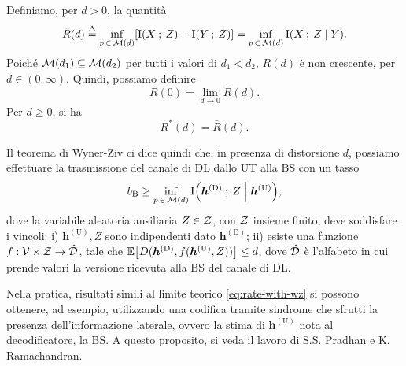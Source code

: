 \begin{thm}
    \label{thm:wz}

    Definiamo, per \(d > 0\), la quantità
    \begin{equation}
        \bar{R}(d) \define \inf_{p\,\in\,\set{M}(d)} \mleft[
            \mutual{X}{Z} - \mutual{Y}{Z}
            \mright]
        = \inf_{p\,\in\,\set{M}(d)} \mutual{X}{Z \given Y} .
    \end{equation}
    Poiché \(\mathcal{M}(d_1) \subseteq \mathcal{M}(d_2)\) per tutti i valori di \(d_1
    < d_2\), \(\bar{R}(d)\) è non crescente, per \(d \in (0,\infty)\). Quindi,
    possiamo definire
    \begin{equation}
        \bar{R}(0) = \lim_{d\to0} \bar{R}(d) .
    \end{equation}
    Per \(d \ge 0\), si ha
    \begin{equation}
        R^{*}(d) = \bar{R}(d) .
    \end{equation}
\end{thm}

Il teorema di Wyner-Ziv ci dice quindi che, in presenza di distorsione \(d\),
possiamo effettuare la trasmissione del canale di DL dallo UT alla BS con un
tasso
\begin{equation}
    b_\mathrm{B} \ge \inf_{p\,\in\,\set{M}(d)}
    \mutual{\bm{h}^\mathrm{(D)}}{Z \given \bm{h}^\mathrm{(U)}} ,
    \label{eq:rate-with-wz}
\end{equation}
dove la variabile aleatoria ausiliaria \(Z \in \mathcal{Z}\), con \(\mathcal{Z}\)
insieme finito, deve soddisfare i vincoli: i) \(\bm{h}^\mathrm{(U)},Z\) sono
indipendenti dato \(\bm{h}^\mathrm{(D)}\); ii) esiste una funzione \(f: \mathcal{V}
\times \mathcal{Z} \to \hat{\mathcal{D}}\), tale che \(\expect{D(\bm{h}^\mathrm{(D)},
f(\bm{h}^\mathrm{(U)},Z))} \le d\), dove \(\hat{\mathcal{D}}\) è l'alfabeto in cui
prende valori la versione ricevuta alla BS del canale di DL.

Nella pratica, risultati simili al limite teorico \eqref{eq:rate-with-wz} si
possono ottenere, ad esempio, utilizzando una codifica tramite sindrome che
sfrutti la presenza dell'informazione laterale, ovvero la stima di
\(\bm{h}^\mathrm{(U)}\) nota al decodificatore, la BS. A questo proposito, si
veda il lavoro di S.S. Pradhan e K. Ramachandran\cite{1184140}.






